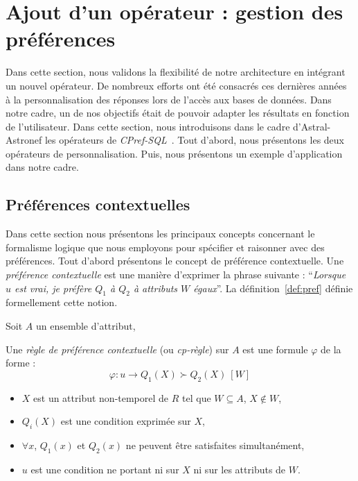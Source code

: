 \section{Ajout d'un opérateur : gestion des préférences} \label{sec:valid:domvision:architecture}
Dans cette section, nous validons la flexibilité de notre architecture en intégrant un nouvel opérateur. De nombreux efforts ont été consacrés ces dernières années à la personnalisation des réponses lors de l'accès aux bases de données. Dans notre cadre, un de nos objectifs était de pouvoir adapter les résultats en fonction de l'utilisateur. Dans cette section, nous introduisons dans le cadre d'Astral-Astronef les opérateurs de \textit{CPref-SQL}~\cite{DeAmo:cprefsql}. Tout d'abord, nous présentons les deux opérateurs de personnalisation. Puis, nous présentons un exemple d'application dans notre cadre.

\subsection{Préférences contextuelles}
Dans cette section nous présentons les principaux concepts concernant le formalisme logique que nous employons pour spécifier et raisonner avec des préférences. Tout d'abord présentons le concept de préférence contextuelle. Une \textit{préférence contextuelle} est une manière d'exprimer la phrase suivante : \enquote{\it Lorsque $u$ est vrai, je préfère $Q_1$ à $Q_2$ à attributs $W$ égaux}. La définition~\ref{def:pref} définie formellement cette notion.

\begin{defi}\label{def:pref}
Soit $A$ un ensemble d'attribut,

Une \textit{règle de préférence contextuelle} (ou \textit{cp-règle}) sur $A$ est une formule $\varphi$ de la forme :
 $$\varphi: u \rightarrow Q_1(X) \succ Q_2(X)\ [W]$$
\begin{itemize}
	\item $X$ est un attribut non-temporel de $R$ tel que $W \subseteq A$, $X \not \in W$,
	\item $Q_i(X)$ est une condition exprimée sur $X$,
	\item $\forall x$, $Q_1(x)$ et $Q_2(x)$ ne peuvent être satisfaites simultanément,
	\item $u$ est une condition ne portant ni sur $X$ ni sur les attributs de $W$.
	\end{itemize}
\end{defi}

